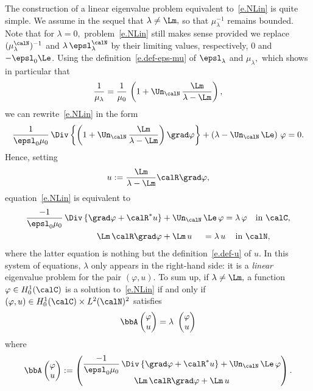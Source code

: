 The construction of a linear eigenvalue problem equivalent to~\eqref{e.NLin} is quite simple. We assume in the sequel that $\lambda \neq \Lm,$ so that $\mu_\lambda^{-1}$ remains bounded. Note that for $\lambda = 0,$ problem~\eqref{e.NLin} still makes sense provided we replace $(\mu^\calN_\lambda)^{-1}$ and $\lambda\,\epsl^\calN_\lambda$ by their limiting values, respectively, $0$ and $-\epsl_0\Le$. Using the definition~\eqref{e.def-eps-mu} of $\epsl_\lambda$ and $\mu_\lambda,$ which shows in particular that
\[
\frac{1}{\mu_\lambda} = \frac{1}{\mu_0}\,\left(1 + \Un_\calN\,\frac{\Lm}{\lambda-\Lm}\right),
\]
we can rewrite~\eqref{e.NLin} in the form
\[
\frac{1}{\epsl_0 \mu_0}\,\Div \left\{ \left(1 + \Un_\calN\,\frac{\Lm}{\lambda-\Lm}\right) \grad\varphi \right\} + \left(\lambda - \Un_\calN\,\Le \right)\,\varphi = 0.
\]
Hence, setting
\begin{equation}
u := \frac{\Lm}{\lambda-\Lm} \calR \grad\varphi,\label{e.def-u}
\end{equation}
equation~\eqref{e.NLin} is equivalent to
\begin{subequations}
\begin{align}
\frac{-1}{\epsl_0 \mu_0}\,\Div \left\{ \grad\varphi + \calR^* u \right\} &+ \Un_\calN\,\Le\,\varphi= \lambda\,\varphi \quad\text{in }\calC, \label{e.Lin-one}
\\
\Lm\,\calR\grad\varphi &+ \Lm\,u\quad\;= \lambda\,u \quad\,\text{in }\calN, \label{e.Lin-two}
\end{align}
\end{subequations}
where the latter equation is nothing but the definition~\eqref{e.def-u} of $u.$ In this system of equations, $\lambda$ only appears in the right-hand side: it is a \emph{linear} eigenvalue problem for the pair $(\varphi,u).$ To sum up, if $\lambda \neq \Lm,$ a function $\varphi \in H^1_0(\calC)$ is a solution to~\eqref{e.NLin} if and only if $(\varphi,u) \in H^1_0(\calC) \times L^2(\calN)^2$ satisfies
\begin{equation}
\bbA
\begin{pmatrix} \varphi \\ u
\end{pmatrix}
= \lambda \
\begin{pmatrix} \varphi \\ u
\end{pmatrix}\label{e.Lin}
\end{equation}
where
\begin{equation}\label{e.defA}
\bbA
\begin{pmatrix} \varphi \\ u
\end{pmatrix}
:=
\begin{pmatrix}
\displaystyle \frac{-1}{\epsl_0 \mu_0}\,\Div \left\{\grad\varphi + \calR^* u \right\} + \Un_\calN\,\Le\,\varphi \\[8pt]
\Lm\,\calR \grad\varphi + \Lm\,u
\end{pmatrix}.
\end{equation}
